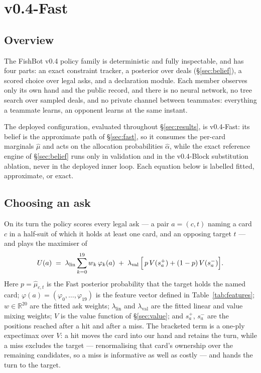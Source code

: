 \documentclass[11pt]{article}
\theoremstyle{definition}
\DeclareRobustCommand{\vfast}{\texorpdfstring{\mbox{v0.4-Fast}}{v0.4-Fast}}
\DeclareRobustCommand{\vblock}{\texorpdfstring{\mbox{v0.4-Block}}{v0.4-Block}}
\begin{document}
\section{\vfast{}}
\label{sec:policy}

\subsection{Overview}

The FishBot v0.4 policy family is deterministic and fully inspectable, and has
four parts: an exact constraint tracker, a posterior over deals
(\S\ref{sec:belief}), a scored choice over legal asks, and a declaration
module. Each member observes only its own hand and the public record, and
there is no neural network, no tree search over sampled deals, and no private
channel between teammates: everything a teammate learns, an opponent learns at
the same instant.

The deployed configuration, evaluated throughout \S\ref{sec:results}, is
\vfast{}: its belief is the approximate path of \S\ref{sec:fast}, so it
consumes the per-card marginals $\hat\mu$ and acts on the allocation
probabilities $\hat\alpha$, while the exact reference engine of
\S\ref{sec:belief} runs only in validation and in the \vblock{} substitution
ablation, never in the deployed inner loop. Each equation below is labelled
fitted, approximate, or exact.

\subsection{Choosing an ask}
\label{sec:ask}

On its turn the policy scores every legal ask --- a pair $a = (c, t)$ naming a
card $c$ in a half-suit of which it holds at least one card, and an opposing
target $t$ --- and plays the maximiser of
\begin{equation}
  U(a) \;=\; \lambda_{\mathrm{lin}} \sum_{k=0}^{19} w_k\, \varphi_k(a)
       \;+\; \lambda_{\mathrm{val}}\,\Bigl[\, p\, V(s^{+}_a) + (1-p)\, V(s^{-}_a) \Bigr].
  \label{eq:askutil}
\end{equation}
Here $p = \hat\mu_{c,t}$ is the Fast posterior probability that the target
holds the named card; $\varphi(a) = (\varphi_0,\dots,\varphi_{19})$ is the
feature vector defined in Table~\ref{tab:features}; $w \in \mathbb{R}^{20}$
are the fitted ask weights; $\lambda_{\mathrm{lin}}$ and
$\lambda_{\mathrm{val}}$ are the fitted linear and value mixing weights; $V$
is the value function of \S\ref{sec:value}; and $s^{+}_a$, $s^{-}_a$ are the
positions reached after a hit and after a miss. The bracketed term is a
one-ply expectimax over $V$: a hit moves the card into our hand and retains
the turn, while a miss excludes the target --- renormalising that card's
ownership over the remaining candidates, so a miss is informative as well as
costly --- and hands the turn to the target.
\end{document}
